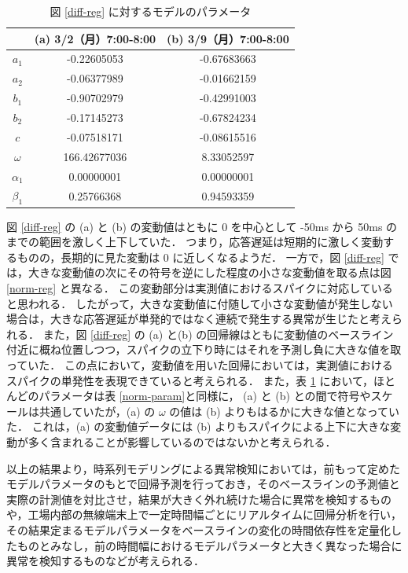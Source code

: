 \documentclass[technicalreport]{ieicej}
\begin{document}
\begin{table}[tb]
\centering
\caption{図 \ref{diff-reg} に対するモデルのパラメータ}
\label{diff-param}
\begin{tabular}{|c|c|c|}
\hline
&(a) 3/2（月）7:00-8:00&(b) 3/9（月）7:00-8:00\\
\hline
$a_1$&-0.22605053&-0.67683663\\
\hline
$a_2$&-0.06377989&-0.01662159\\
\hline
$b_1$&-0.90702979&-0.42991003\\
\hline
$b_2$&-0.17145273&-0.67824234\\
\hline
$c$&-0.07518171&-0.08615516\\
\hline
$\omega$&166.42677036&8.33052597\\
\hline
$\alpha_1$&0.00000001&0.00000001\\
\hline
$\beta_1$&0.25766368&0.94593359\\
\hline
\end{tabular}
\end{table}

図 \ref{diff-reg} の (a) と (b) の変動値はともに 0 を中心として -50ms から 50ms のまでの範囲を激しく上下していた．
つまり，応答遅延は短期的に激しく変動するものの，長期的に見た変動は 0 に近しくなるようだ．
一方で，図 \ref{diff-reg} では，大きな変動値の次にその符号を逆にした程度の小さな変動値を取る点は図 \ref{norm-reg} と異なる．
この変動部分は実測値におけるスパイクに対応していると思われる．
したがって，大きな変動値に付随して小さな変動値が発生しない場合は，大きな応答遅延が単発的ではなく連続で発生する異常が生じたと考えられる．
また，図 \ref{diff-reg} の (a) と(b) の回帰線はともに変動値のベースライン付近に概ね位置しつつ，スパイクの立下り時にはそれを予測し負に大きな値を取っていた．
この点において，変動値を用いた回帰においては，実測値におけるスパイクの単発性を表現できていると考えられる．
また，表 \ref{diff-param} において，ほとんどのパラメータは表 \ref{norm-param}と同様に， (a) と (b) との間で符号やスケールは共通していたが，(a) の $\omega$ の値は (b) よりもはるかに大きな値となっていた．
これは，(a) の変動値データには (b) よりもスパイクによる上下に大きな変動が多く含まれることが影響しているのではないかと考えられる．

以上の結果より，時系列モデリングによる異常検知においては，前もって定めたモデルパラメータのもとで回帰予測を行っておき，そのベースラインの予測値と実際の計測値を対比させ，結果が大きく外れ続けた場合に異常を検知するものや，工場内部の無線端末上で一定時間幅ごとにリアルタイムに回帰分析を行い，その結果定まるモデルパラメータをベースラインの変化の時間依存性を定量化したものとみなし，前の時間幅におけるモデルパラメータと大きく異なった場合に異常を検知するものなどが考えられる．
\end{document}
